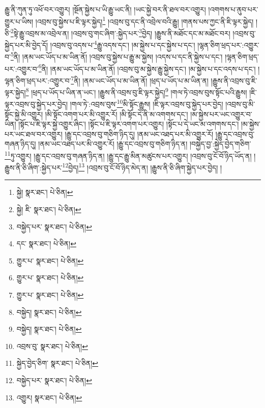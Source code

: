 རྒྱུ་ནི་ཀུན་ཏུ་འཕོ་བར་འགྱུར། །སྔོན་སྐྱེས་པ་ཡི་རྒྱུ་ཡང་ནི། །ཡང་སྐྱེ་བར་ནི་ཐལ་བར་འགྱུར། །འགགས་པ་ནུབ་པར་གྱུར་པ་ཡིས། །འབྲས་བུ་སྐྱེས་པ་ཇི་ལྟར་སྐྱེད།\footnote{སྐྱེ།  སྣར་ཐང་།  པེ་ཅིན། } །འབྲས་བུ་དང་ནི་འབྲེལ་བའི་རྒྱུ། །གནས་པས་ཀྱང་ནི་ཇི་ལྟར་སྐྱེད། །ཅི་\footnote{སྐྱེ། ཇི་  སྣར་ཐང་།  པེ་ཅིན། }སྟེ་རྒྱུ་འབྲས་མ་འབྲེལ་ན། །འབྲས་བུ་གང་ཞིག་:སྐྱེད་པར་\footnote{བསྐྱེད་པར་  སྣར་ཐང་།  པེ་ཅིན། }བྱེད། །རྒྱུས་ནི་མཐོང་དང་མ་མཐོང་བར། །འབྲས་བུ་སྐྱེད་པར་མི་བྱེད་དོ། །འབྲས་བུ་འདས་པ་\footnote{དང་  སྣར་ཐང་།  པེ་ཅིན། }རྒྱུ་འདས་དང་། །མ་སྐྱེས་པ་དང་སྐྱེས་པ་དང་། །ལྷན་ཅིག་ཕྲད་པར་:འགྱུར་བ་\footnote{གྱུར་པ་  སྣར་ཐང་།  པེ་ཅིན། }ནི། །ནམ་ཡང་ཡོད་པ་མ་ཡིན་ནོ། །འབྲས་བུ་སྐྱེས་པ་རྒྱུ་མ་སྐྱེས། །འདས་པ་དང་ནི་སྐྱེས་པ་དང་། །ལྷན་ཅིག་ཕྲད་པར་:འགྱུར་བ་\footnote{གྱུར་པ་  སྣར་ཐང་།  པེ་ཅིན། }ནི། །ནམ་ཡང་ཡོད་པ་མ་ཡིན་ནོ། །འབྲས་བུ་མ་སྐྱེས་རྒྱུ་སྐྱེས་དང་། །མ་སྐྱེས་པ་དང་འདས་པ་དང་། །ལྷན་ཅིག་ཕྲད་པར་:འགྱུར་བ་\footnote{གྱུར་པ་  སྣར་ཐང་།  པེ་ཅིན། }ནི། །ནམ་ཡང་ཡོད་པ་མ་ཡིན་ནོ། །ཕྲད་པ་ཡོད་པ་མ་ཡིན་ན། །རྒྱུས་ནི་འབྲས་བུ་ཇི་ལྟར་སྐྱེད།\footnote{བསྐྱེད།  སྣར་ཐང་།  པེ་ཅིན། } །ཕྲད་པ་ཡོད་པ་ཡིན་ན་ཡང་། །རྒྱུས་ནི་འབྲས་བུ་ཇི་ལྟར་སྐྱེད།\footnote{བསྐྱེད།  སྣར་ཐང་།  པེ་ཅིན། } །གལ་ཏེ་འབྲས་བུས་སྟོང་པའི་རྒྱུས། །ཇི་ལྟར་འབྲས་བུ་སྐྱེད་པར་བྱེད། །གལ་ཏེ་:འབྲས་བུས་\footnote{འབྲས་བུ་  སྣར་ཐང་།  པེ་ཅིན། }མི་སྟོང་རྒྱུས། །ཇི་ལྟར་འབྲས་བུ་སྐྱེད་པར་བྱེད། །འབྲས་བུ་མི་སྟོང་སྐྱེ་མི་འགྱུར། །མི་སྟོང་འགག་པར་མི་འགྱུར་རོ། །མི་སྟོང་དེ་ནི་མ་འགགས་དང་། །མ་སྐྱེས་པར་ཡང་འགྱུར་བ་ཡིན། །སྟོང་པ་ཇི་ལྟར་སྐྱེ་འགྱུར་ཞིང་། །སྟོང་པ་ཇི་ལྟར་འགག་པར་འགྱུར། །སྟོང་པ་དེ་ཡང་མ་འགགས་དང་། །མ་སྐྱེས་པར་ཡང་ཐལ་བར་འགྱུར། །རྒྱུ་དང་འབྲས་བུ་གཅིག་ཉིད་དུ། །ནམ་ཡང་འཐད་པར་མི་འགྱུར་རོ། །རྒྱུ་དང་འབྲས་བུ་གཞན་ཉིད་དུ། །ནམ་ཡང་འཐད་པར་མི་འགྱུར་རོ། །རྒྱུ་དང་འབྲས་བུ་གཅིག་ཉིད་ན། །བསྐྱེད་བྱ་:སྐྱེད་བྱེད་གཅིག་\footnote{སྐྱེད་བྱེད་ཅིག་  སྣར་ཐང་།  པེ་ཅིན། }ཏུ་འགྱུར། །རྒྱུ་དང་འབྲས་བུ་གཞན་ཉིད་ན། །རྒྱུ་དང་རྒྱུ་མིན་མཚུངས་པར་འགྱུར། །འབྲས་བུ་ངོ་བོ་ཉིད་ཡོད་ན། །རྒྱུས་ནི་ཅི་ཞིག་:སྐྱེད་པར་\footnote{བསྐྱེད་པར་  སྣར་ཐང་།  པེ་ཅིན། }བྱེད།\footnote{འགྱུར།  སྣར་ཐང་།  པེ་ཅིན། } །འབྲས་བུ་ངོ་བོ་ཉིད་མེད་ན། །རྒྱུས་ནི་ཅི་ཞིག་སྐྱེད་པར་བྱེད། །
